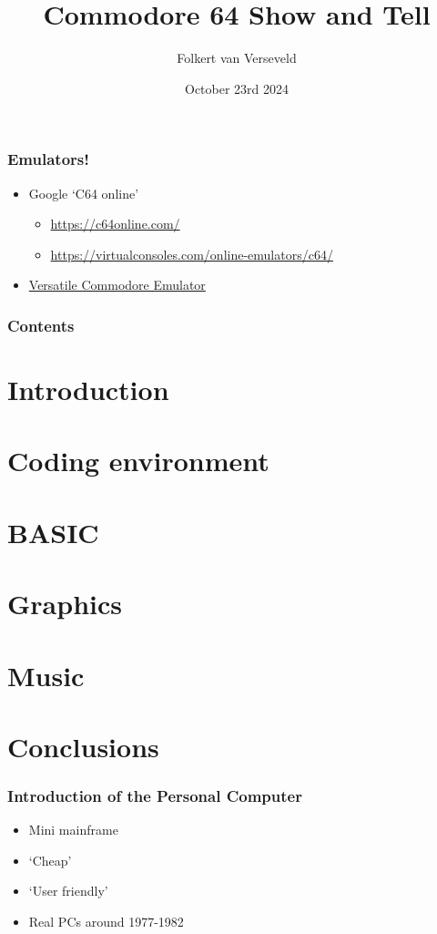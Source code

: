 \documentclass{beamer}
\title{Commodore 64 Show and Tell}
\author{Folkert van Verseveld}
\date{October 23rd 2024}
\begin{document}
\maketitle


\begin{frame}
    \frametitle{Emulators!}
    \begin{itemize}
    \item Google `C64 online'
    \begin{itemize}
        \item \url{https://c64online.com/}
        \item \url{https://virtualconsoles.com/online-emulators/c64/}
    \end{itemize}
    \item \href{https://vice-emu.sourceforge.io/index.html\#download}{Versatile Commodore Emulator}
    \end{itemize}
\end{frame}

\begin{frame}
\frametitle{Contents}
\tableofcontents
\end{frame}

\section{Introduction}
\section{Coding environment}
\section{BASIC}
\section{Graphics}
\section{Music}

\section{Conclusions}


\begin{frame}
\frametitle{Introduction of the Personal Computer}

\begin{itemize}
\item Mini mainframe
\item `Cheap'
\item `User friendly'
\item Real PCs around 1977-1982
\end{itemize}

\end{frame}
\end{document}
